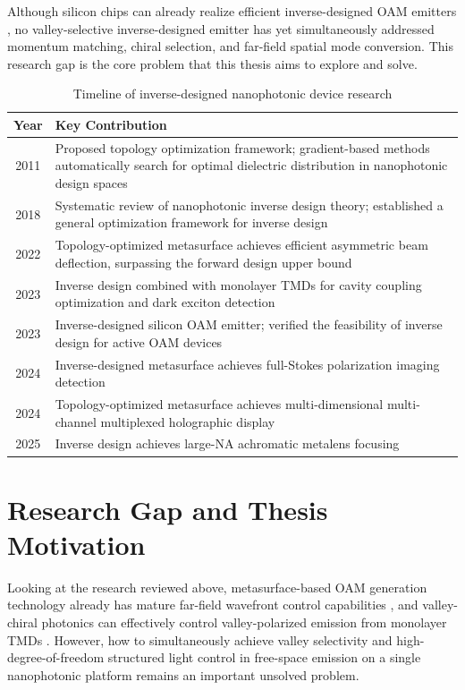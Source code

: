 Although silicon chips can already realize efficient inverse-designed OAM emitters \cite{white2023inverse}, no valley-selective inverse-designed emitter has yet simultaneously addressed momentum matching, chiral selection, and far-field spatial mode conversion. This research gap is the core problem that this thesis aims to explore and solve.

\begin{table}[H]
\centering
\caption{Timeline of inverse-designed nanophotonic device research}
\label{tab:timeline_inverse}
\small
\begin{tabular}{c p{11cm}}
\toprule
\textbf{Year} & \textbf{Key Contribution} \\
\midrule
2011 & Proposed topology optimization framework; gradient-based methods automatically search for optimal dielectric distribution in nanophotonic design spaces \cite{jensen2011topology} \\
2018 & Systematic review of nanophotonic inverse design theory; established a general optimization framework for inverse design \cite{molesky2018inverse} \\
2022 & Topology-optimized metasurface achieves efficient asymmetric beam deflection, surpassing the forward design upper bound \cite{li2022empowering} \\
2023 & Inverse design combined with monolayer TMDs for cavity coupling optimization and dark exciton detection \cite{gelly2023inverse} \\
2023 & Inverse-designed silicon OAM emitter; verified the feasibility of inverse design for active OAM devices \cite{white2023inverse} \\
2024 & Inverse-designed metasurface achieves full-Stokes polarization imaging detection \cite{wang2024non} \\
2024 & Topology-optimized metasurface achieves multi-dimensional multi-channel multiplexed holographic display \cite{yin2024multi} \\
2025 & Inverse design achieves large-NA achromatic metalens focusing \cite{choi2025roll} \\
\bottomrule
\end{tabular}
\end{table}

\section{Research Gap and Thesis Motivation}

Looking at the research reviewed above, metasurface-based OAM generation technology already has mature far-field wavefront control capabilities \cite{liu2017generation, sroor2020high}, and valley-chiral photonics can effectively control valley-polarized emission from monolayer TMDs \cite{xiao2012coupled, gong2018nanoscale}. However, how to simultaneously achieve valley selectivity and high-degree-of-freedom structured light control in free-space emission on a single nanophotonic platform remains an important unsolved problem.

